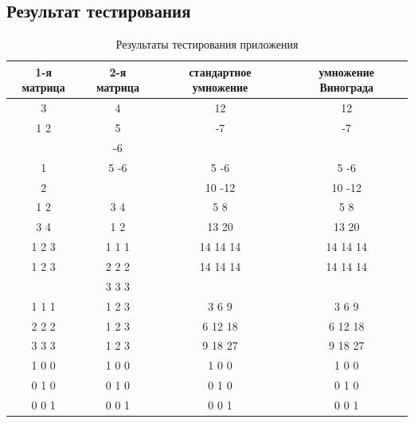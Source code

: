 \documentclass[a4paper,12pt]{article}
\begin{document}
\newpage
\subsection{Результат тестирования}
\begin{table}[h]
\caption{\label{tablice:tests}Результаты тестирования приложения}
\begin{center}
\begin{tabular}{|c|c|c|c|}
\hline
1-я матрица & 2-я матрица & стандартное умножение & умножение Винограда \\
\hline
3 & 4 & 12 & 12 \\
\hline
1 2 & 5 & -7 & -7\\
 & -6 & & \\
\hline
1 & 5 -6 & 5 -6 & 5 -6\\
2 & & 10 -12 & 10 -12\\
\hline
1 2 & 3 4 & 5 8 & 5 8 \\
3 4 & 1 2 & 13 20 & 13 20 \\
\hline
1 2 3 & 1 1 1 & 14 14 14 & 14 14 14 \\
1 2 3 & 2 2 2 & 14 14 14 & 14 14 14 \\
      & 3 3 3 & & \\
\hline
1 1 1 & 1 2 3 & 3 6 9 & 3 6 9 \\
2 2 2 & 1 2 3 & 6 12 18 & 6 12 18 \\
3 3 3 & 1 2 3 & 9 18 27 & 9 18 27 \\
\hline
1 0 0 & 1 0 0 & 1 0 0 & 1 0 0\\
0 1 0 & 0 1 0 & 0 1 0 & 0 1 0\\
0 0 1 & 0 0 1 & 0 0 1 & 0 0 1\\
\hline
\end{tabular}
\end{center}
\end{table}

\newpage
\end{document}
